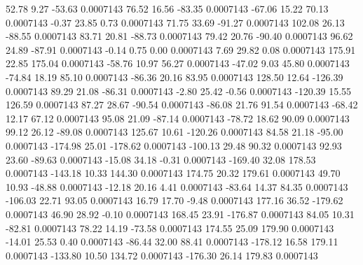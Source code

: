        52.78        9.27      -53.63     0.0007143
       76.52       16.56      -83.35     0.0007143
      -67.06       15.22       70.13     0.0007143
       -0.37       23.85        0.73     0.0007143
       71.75       33.69      -91.27     0.0007143
      102.08       26.13      -88.55     0.0007143
       83.71       20.81      -88.73     0.0007143
       79.42       20.76      -90.40     0.0007143
       96.62       24.89      -87.91     0.0007143
       -0.14        0.75        0.00     0.0007143
        7.69       29.82        0.08     0.0007143
      175.91       22.85      175.04     0.0007143
      -58.76       10.97       56.27     0.0007143
      -47.02        9.03       45.80     0.0007143
      -74.84       18.19       85.10     0.0007143
      -86.36       20.16       83.95     0.0007143
      128.50       12.64     -126.39     0.0007143
       89.29       21.08      -86.31     0.0007143
       -2.80       25.42       -0.56     0.0007143
     -120.39       15.55      126.59     0.0007143
       87.27       28.67      -90.54     0.0007143
      -86.08       21.76       91.54     0.0007143
      -68.42       12.17       67.12     0.0007143
       95.08       21.09      -87.14     0.0007143
      -78.72       18.62       90.09     0.0007143
       99.12       26.12      -89.08     0.0007143
      125.67       10.61     -120.26     0.0007143
       84.58       21.18      -95.00     0.0007143
     -174.98       25.01     -178.62     0.0007143
     -100.13       29.48       90.32     0.0007143
       92.93       23.60      -89.63     0.0007143
      -15.08       34.18       -0.31     0.0007143
     -169.40       32.08      178.53     0.0007143
     -143.18       10.33      144.30     0.0007143
      174.75       20.32      179.61     0.0007143
       49.70       10.93      -48.88     0.0007143
      -12.18       20.16        4.41     0.0007143
      -83.64       14.37       84.35     0.0007143
     -106.03       22.71       93.05     0.0007143
       16.79       17.70       -9.48     0.0007143
      177.16       36.52     -179.62     0.0007143
       46.90       28.92       -0.10     0.0007143
      168.45       23.91     -176.87     0.0007143
       84.05       10.31      -82.81     0.0007143
       78.22       14.19      -73.58     0.0007143
      174.55       25.09      179.90     0.0007143
      -14.01       25.53        0.40     0.0007143
      -86.44       32.00       88.41     0.0007143
     -178.12       16.58      179.11     0.0007143
     -133.80       10.50      134.72     0.0007143
     -176.30       26.14      179.83     0.0007143
